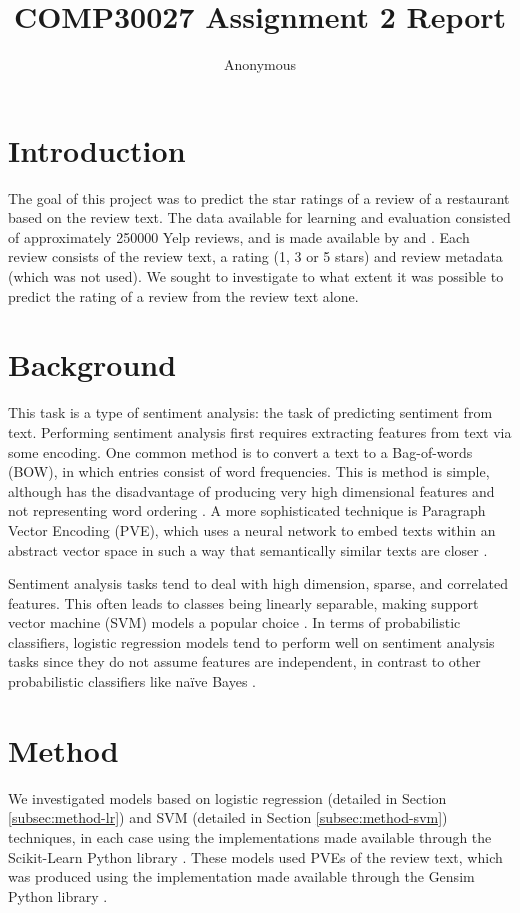 \documentclass[11pt]{article}
\title{COMP30027 Assignment 2 Report}
\author
{Anonymous}
\begin{document}
\maketitle

\section{Introduction}
The goal of this project was to predict the star ratings of a review of a restaurant based on the review text. The data available for learning and evaluation consisted of approximately 250000 Yelp reviews, and is made available by \cite{medhat_sentiment_2014} and \cite{rayana_collective_2015}. Each review consists of the review text, a rating (1, 3 or 5 stars) and review metadata (which was not used). We sought to investigate to what extent it was possible to predict the rating of a review from the review text alone. 

\section{Background}
This task is a type of sentiment analysis: the task of predicting sentiment from text. Performing sentiment analysis first requires extracting features from text via some encoding. One common method is to convert a text to a Bag-of-words (BOW), in which entries consist of word frequencies. This is method is simple, although has the disadvantage of producing very high dimensional features and not representing word ordering \cite{le_distributed_2014}. A more sophisticated technique is Paragraph Vector Encoding (PVE), which uses a neural network to embed texts within an abstract vector space in such a way that semantically similar texts are closer \cite{le_distributed_2014}.

Sentiment analysis tasks tend to deal with high dimension, sparse, and correlated features. This often leads to classes being linearly separable, making support vector machine (SVM) models a popular choice \cite{medhat_sentiment_2014}. In terms of probabilistic classifiers, logistic regression models tend to perform well on sentiment analysis tasks since they do not assume features are independent, in contrast to other probabilistic classifiers like na\"{i}ve Bayes \cite{medhat_sentiment_2014}.

\section{Method} \label{sec:method}
We investigated models based on logistic regression (detailed in Section \ref{subsec:method-lr}) and SVM (detailed in Section \ref{subsec:method-svm}) techniques, in each case using the implementations made available through the Scikit-Learn Python library \cite{sklearn_pedregosa_scikit-learn_2011}. These models used PVEs of the review text, which was produced using the implementation made available through the Gensim Python library \cite{gensim_rehurek_software_2010}. 
\end{document}
